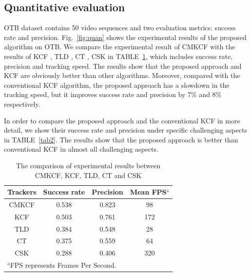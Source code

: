 \documentclass[conference]{IEEEtran}
\begin{document}
\subsection{Quantitative evaluation}
OTB dataset \cite{OTB} contains 50 video sequences and two evaluation metrics: success rate and precision.
Fig.~\ref{fig:quan} shows the experimental results of the proposed algorithm on OTB.
We compare the experimental result of CMKCF with the results of KCF \cite{KCF}, TLD \cite{TLD}, CT \cite{CT}, CSK \cite{CSK} in TABLE~\ref{tab1}, which includes success rate, precision and tracking speed.
The results show that the proposed approach and KCF are obviously better than other algorithms.
Moreover, compared with the conventional KCF algorithm, the proposed approach has a slowdown in the tracking speed, but it improves success rate and precision by 7\% and 8\% respectively.

In order to compare the proposed approach and the conventional KCF in more detail, we show their success rate and precision under specific challenging aspects in TABLE~\ref{tab2}.
The results show that the proposed approach is better than conventional KCF in almost all challenging aspects.

\begin{table}[htbp]
	\caption{The comparison of experimental results between CMKCF, KCF, TLD, CT and CSK}
	\begin{center}
		\begin{tabular}{|c|c|c|c|}
			\hline
			\textbf{Trackers}&\textbf{Success rate}&\textbf{Precision}&\textbf{Mean FPS$^{\mathrm{a}}$}\\
		     \hline
			CMKCF&0.538&0.823&98 \\
			\hline
			KCF\cite{KCF}&0.503&0.761&172\\
			\hline
			TLD\cite{TLD}&0.384&0.548&28  \\
			\hline
			CT\cite{CT}&0.375&0.559&64 \\
			\hline
			CSK\cite{CSK}&0.288&0.406&320 \\
			\hline
			\multicolumn{4}{l}{$^{\mathrm{a}}$FPS represents Frames Per Second.}
		\end{tabular}
		\label{tab1}
	\end{center}
\end{table}
\end{document}
